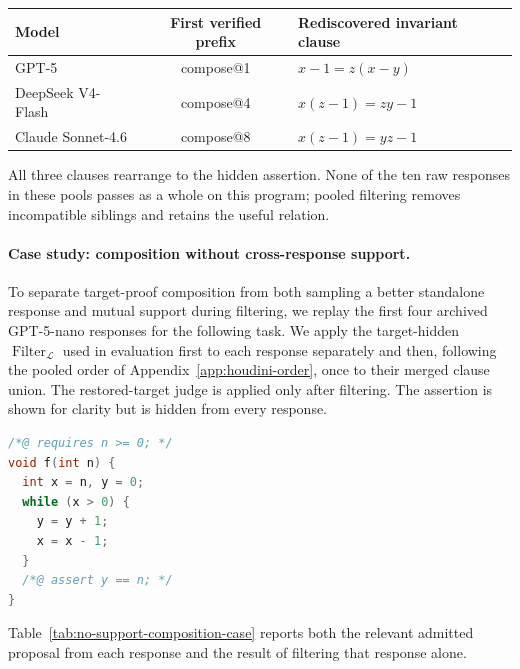 \begin{center}
\small
\setlength{\tabcolsep}{4pt}
\begin{tabular}{lcl}
\toprule
\rowcolor{algobg}
Model & First verified prefix & Rediscovered invariant clause \\
\midrule
GPT-5 & compose@1 & \(x-1=z(x-y)\) \\
DeepSeek V4-Flash & compose@4 & \(x(z-1)=zy-1\) \\
Claude Sonnet-4.6 & compose@8 & \(x(z-1)=yz-1\) \\
\bottomrule
\end{tabular}
\end{center}

All three clauses rearrange to the hidden assertion.  None of the ten raw
responses in these pools passes as a whole on this program; pooled filtering
removes incompatible siblings and retains the useful relation.

\paragraph{Case study: composition without cross-response support.}
To separate target-proof composition from both sampling a better standalone
response and mutual support during filtering, we replay the first four
archived GPT-5-nano responses for the following task.  We apply the
target-hidden \(\operatorname{Filter}_{\mathcal L}\) used in evaluation first
to each response separately and then, following the pooled order of
Appendix~\ref{app:houdini-order}, once to their merged clause union.  The
restored-target judge is applied only after filtering.  The assertion is shown
for clarity but is hidden from every response.

\begin{lstlisting}[language=C]
/*@ requires n >= 0; */
void f(int n) {
  int x = n, y = 0;
  while (x > 0) {
    y = y + 1;
    x = x - 1;
  }
  /*@ assert y == n; */
}
\end{lstlisting}

Table~\ref{tab:no-support-composition-case} reports both the relevant admitted
proposal from each response and the result of filtering that response alone.

